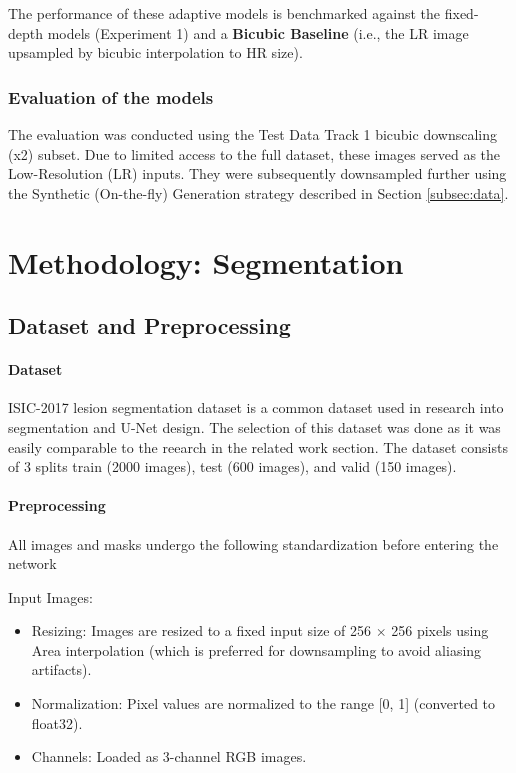The performance of these adaptive models is benchmarked against the fixed-depth models (Experiment 1) and a \textbf{Bicubic Baseline} (i.e., the LR image upsampled by bicubic interpolation to HR size).


\subsubsection{Evaluation of the models} 

The evaluation was conducted using the Test Data Track 1 bicubic downscaling (x2) subset. Due to limited access to the full dataset, these images served as the Low-Resolution (LR) inputs. They were subsequently downsampled further using the Synthetic (On-the-fly) Generation strategy described in Section \ref{subsec:data}.

\section{Methodology: Segmentation}
\label{sec:methodology_segmentation}

\subsection{Dataset and Preprocessing}

\paragraph{Dataset}
ISIC-2017 lesion segmentation dataset is a common dataset used in research into segmentation and U-Net design. The selection of this dataset was done as it was easily comparable to the reearch in the related work section. The dataset consists of 3 splits train (2000 images), test (600 images), and valid (150 images). 

\paragraph{Preprocessing}
All images and masks undergo the following standardization before entering the network

Input Images:
\begin{itemize}
    \item Resizing: Images are resized to a fixed input size of 256 $\times$ 256 pixels using Area interpolation (which is preferred for downsampling to avoid aliasing artifacts).
    \item Normalization: Pixel values are normalized to the range [0, 1] (converted to float32).
    \item Channels: Loaded as 3-channel RGB images.
\end{itemize}



